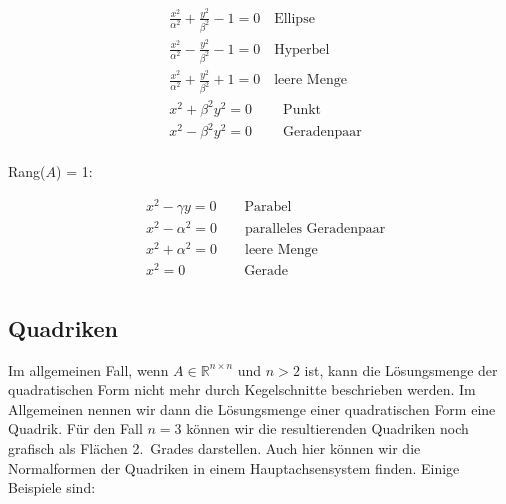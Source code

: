 \begin{equation*}
    \begin{aligned}
        & \frac{x^2}{\alpha^2} + \frac{y^2}{\beta^2} - 1 = 0  \quad \text{Ellipse} \\
        & \frac{x^2}{\alpha^2} - \frac{y^2}{\beta^2} - 1 = 0  \quad \text{Hyperbel} \\
        & \frac{x^2}{\alpha^2} + \frac{y^2}{\beta^2} + 1 = 0  \quad \text{leere Menge} \\
        & x^2 + \beta^2 y^2 = 0 \qquad \ \text{Punkt} \\[0.5em]
        & x^2 - \beta^2 y^2 = 0 \qquad \ \text{Geradenpaar} \\
    \end{aligned}
\end{equation*}
        
Rang(\( A \)) = 1:

\begin{equation*}
    \begin{aligned}
        & x^2 - \gamma y = 0 \qquad \text{Parabel} \\
        & x^2 - \alpha^2 = 0 \qquad \text{paralleles Geradenpaar} \\
        & x^2 + \alpha^2 = 0 \qquad \text{leere Menge} \\
        & x^2 = 0 \qquad \qquad \ \text{Gerade} \\
    \end{aligned}
\end{equation*}

\subsection{Quadriken}

Im allgemeinen Fall, wenn \( A \in \mathbb{R}^{n \times n} \) und \( n > 2 \) ist, kann die Lösungsmenge der quadratischen Form nicht mehr durch Kegelschnitte beschrieben werden. Im Allgemeinen nennen wir dann die Lösungsmenge einer quadratischen Form eine Quadrik. Für den Fall \( n = 3 \) können wir die resultierenden Quadriken noch grafisch als Flächen 2.\ Grades darstellen. Auch hier können wir die Normalformen der Quadriken in einem Hauptachsensystem finden. Einige Beispiele sind:

\vspace{0.5\baselineskip}

